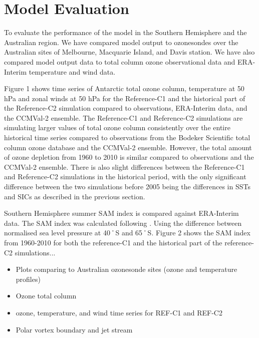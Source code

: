 \section{Model Evaluation}
To evaluate the performance of the model in the Southern Hemisphere and the Australian region. We have compared model output to ozonesondes over the Australian sites of Melbourne, Macquarie Island, and Davis station. We have also compared model output data to total column ozone observational data and ERA-Interim temperature and wind data. 

Figure 1 shows time series of Antarctic total ozone column, temperature at 50 hPa and zonal winds at 50 hPa for the Reference-C1 and the historical part of the Reference-C2 simulation compared to observations, ERA-Interim data, and the CCMVal-2 ensemble. The Reference-C1 and Reference-C2 simulations are simulating larger values of total ozone column consistently over the entire historical time series compared to observations from the Bodeker Scientific total column ozone database and the CCMVal-2 ensemble. However, the total amount of ozone depletion from 1960 to 2010 is similar compared to observations and the CCMVal-2 ensemble. There is also slight differences between the Reference-C1 and Reference-C2 simulations in the historical period, with the only significant difference between the two simulations before 2005 being the differences in SSTs and SICs as described in the previous section.

Southern Hemisphere summer SAM index is compared against ERA-Interim data. The SAM index was calculated following \cite{DaoyiGong:2007vm}. Using the difference between normalised sea level pressure at 40˚S and 65˚S. Figure 2 shows the SAM index from 1960-2010 for both the reference-C1 and the historical part of the reference-C2 simulations...

\begin{itemize}
\item Plots comparing to Australian ozonesonde sites (ozone and temperature profiles)
\item Ozone total column
\item ozone, temperature, and wind time series for REF-C1 and REF-C2
\item Polar vortex boundary and jet stream
\end{itemize}